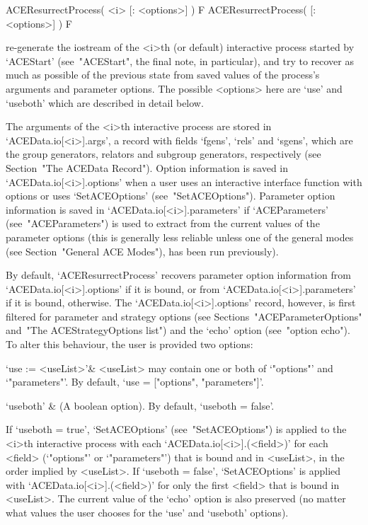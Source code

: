 \>ACEResurrectProcess( <i> [: <options>] ) F
\>ACEResurrectProcess( [: <options>] ) F

re-generate the {\GAP} iostream of the <i>th (or default)  interactive
{\ACE} process started by `ACEStart' (see~"ACEStart", the final  note,
in particular), and try to recover as much as possible of the previous
state from saved values  of  the  process's  arguments  and  parameter
options. The possible <options> here are `use' and `useboth' which are
described in detail below.

The arguments of the <i>th interactive {\ACE} process  are  stored  in
`ACEData.io[<i>].args', a  record  with  fields  `fgens',  `rels'  and
`sgens', which are the {\GAP} group generators, relators and  subgroup
generators, respectively (see Section~"The  ACEData  Record").  Option
information is saved in `ACEData.io[<i>].options' when a user uses  an
interactive  {\ACE}  interface   function   with   options   or   uses
`SetACEOptions' (see~"SetACEOptions"). Parameter option information is
saved in `ACEData.io[<i>].parameters' if `ACEParameters' (see~"ACEParameters")
is used to extract from  {\ACE}  the  current  values  of  the  {\ACE}
parameter options (this is generally less reliable unless one  of  the
general {\ACE} modes (see Section~"General ACE Modes"), has  been  run
previously).

By   default,   `ACEResurrectProcess'   recovers   parameter    option
information from `ACEData.io[<i>].options' if it  is  bound,  or  from
`ACEData.io[<i>].parameters'  if   it   is   bound,   otherwise.   The
`ACEData.io[<i>].options'  record,  however,  is  first  filtered  for
parameter and  strategy  options  (see  Sections~"ACEParameterOptions"
and~"The ACEStrategyOptions list") and the `echo' option  (see~"option
echo"). To alter this behaviour, the user is provided two options:

\beginitems

\quad`use := <useList>'& <useList>  may   contain   one  or  both   of
`"options"'  and  `"parameters"'.  By  default,  `use  =   ["options",
"parameters"]'.

\quad`useboth' & (A boolean option). By default, `useboth = false'.

\enditems

If `useboth = true', `SetACEOptions' (see~"SetACEOptions") is  applied
to    the    <i>th    interactive    {\ACE}    process    with    each
`ACEData.io[<i>].(<field>)'   for   each   <field>   (`"options"'   or
`"parameters"') that is bound and in <useList>, in the  order  implied
by <useList>. If `useboth = false', `SetACEOptions'  is  applied  with
`ACEData.io[<i>].(<field>)' for only the first <field> that  is  bound
in <useList>. The current value of the `echo' option is also preserved
(no matter what values the user chooses for the  `use'  and  `useboth'
options).

